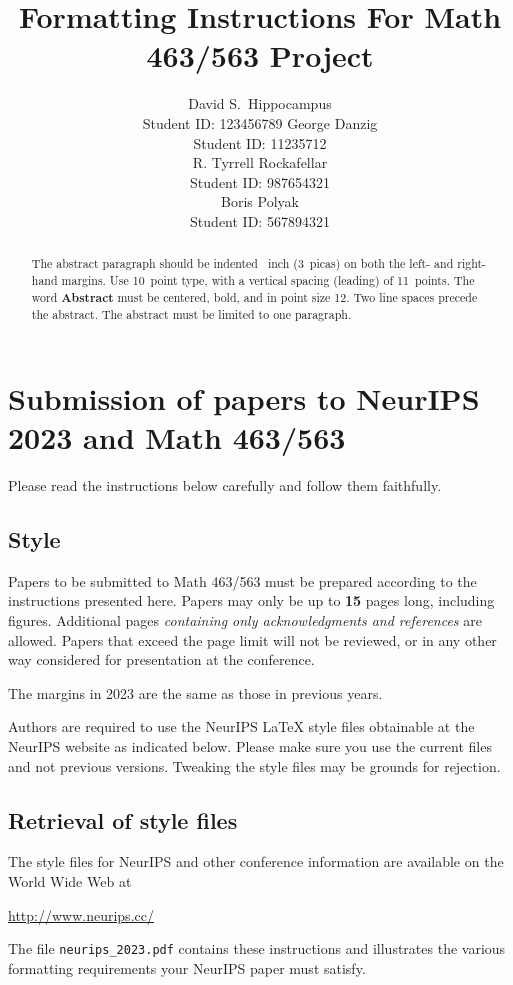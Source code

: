 \documentclass{article}
\title{Formatting Instructions For Math 463/563 Project}
\author{%
  David S.~Hippocampus \\
  Student ID: 123456789
  \And
 George Danzig \\
 Student ID: 11235712\\
 \AND
 R. Tyrrell Rockafellar\\
 Student ID: 987654321\\
 \And
 Boris Polyak\\
 Student ID: 567894321\\ 
}
\begin{document}
\maketitle


\begin{abstract}
  The abstract paragraph should be indented ~inch (3~picas) on
  both the left- and right-hand margins. Use 10~point type, with a vertical
  spacing (leading) of 11~points.  The word \textbf{Abstract} must be centered,
  bold, and in point size 12. Two line spaces precede the abstract. The abstract
  must be limited to one paragraph.
\end{abstract}


\section{Submission of papers to NeurIPS 2023 and Math 463/563}


Please read the instructions below carefully and follow them faithfully.


\subsection{Style}


Papers to be submitted to Math 463/563 must be prepared according to the
instructions presented here. Papers may only be up to {\bf 15} pages long,
including figures. Additional pages \emph{containing only acknowledgments and
references} are allowed. Papers that exceed the page limit will not be
reviewed, or in any other way considered for presentation at the conference.


The margins in 2023 are the same as those in previous years.


Authors are required to use the NeurIPS \LaTeX{} style files obtainable at the
NeurIPS website as indicated below. Please make sure you use the current files
and not previous versions. Tweaking the style files may be grounds for
rejection.


\subsection{Retrieval of style files}


The style files for NeurIPS and other conference information are available on
the World Wide Web at
\begin{center}
  \url{http://www.neurips.cc/}
\end{center}
The file \verb+neurips_2023.pdf+ contains these instructions and illustrates the
various formatting requirements your NeurIPS paper must satisfy.
\end{document}
